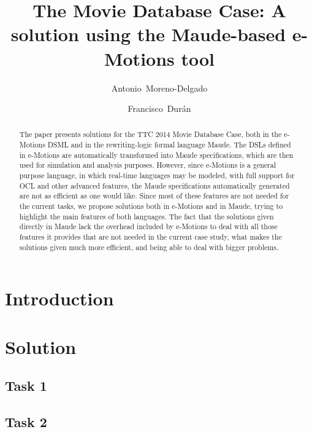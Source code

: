 \documentclass[draft]{llncs}
\title{The Movie Database Case: A solution using the Maude-based e-Motions tool}
\author{Antonio~Moreno-Delgado \and Francisco~Dur\'an}
\institute{
    University of M\'alaga\\
    \email{\{amoreno,duran\}@lcc.uma.es}
    }
\begin{document}
\maketitle

\begin{abstract}
The paper presents solutions for the TTC 2014 Movie Database Case, both in the e-Motions DSML and in the rewriting-logic formal language Maude. The DSLs defined in e-Motions are automatically transformed into Maude specifications, which are then used for simulation and analysis purposes. However, since e-Motions is a general purpose language, in which real-time languages may be modeled, with full support for OCL and other advanced features, the Maude specifications automatically generated are not as efficient as one would like. Since most of these features are not needed for the current tasks, we propose solutions both in e-Motions and in Maude, trying to highlight the main features of both languages. The fact that the solutions given directly in Maude lack the overhead included by e-Motions to deal with all those features it provides that are not needed in the current case study, what makes the solutions given much more efficient, and being able to deal with bigger problems. 
\end{abstract}

\section{Introduction}
\label{sec:intro}


\section{Solution}
\label{sec:solution}


\subsection{Task 1}
\label{sub:task1}


\subsection{Task 2}
\label{sub:task2}

\end{document}
